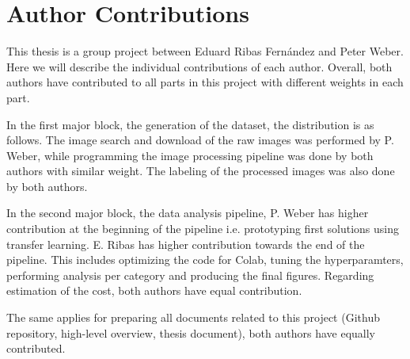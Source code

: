
\chapter{Author Contributions} %

\label{AuthorContributions}

This thesis is a group project between Eduard Ribas Fernández and Peter Weber. Here we will describe the individual contributions of each author. Overall, both authors have contributed to all parts in this project with different weights in each part.

In the first major block, the generation of the dataset, the distribution is as follows. The image search and download of the raw images was performed by P. Weber, while programming the image processing pipeline was done by both authors with similar weight. The labeling of the processed images was also done by both authors.

In the second major block, the data analysis pipeline, P. Weber has higher contribution at the beginning of the pipeline i.e. prototyping first solutions using transfer learning. E. Ribas has higher contribution towards the end of the pipeline. This includes optimizing the code for Colab, tuning the hyperparamters, performing analysis per category and producing the final figures.
Regarding estimation of the cost, both authors have equal contribution.

The same applies for preparing all documents related to this project (Github repository, high-level overview, thesis document), both authors have equally contributed.